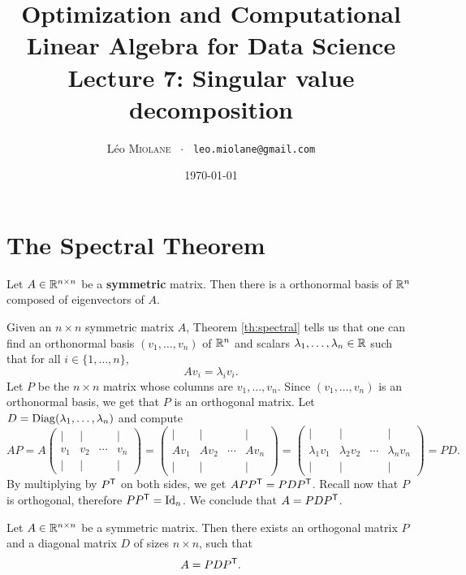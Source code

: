 \documentclass[11pt,nocut]{article}
\title{\vspace{-2.0cm}%
	Optimization and Computational Linear Algebra for Data Science\\
Lecture 7: Singular value decomposition}
\author{Léo \textsc{Miolane} \ $\cdot$ \ \texttt{leo.miolane@gmail.com}}
\date{\today}
\begin{document}
\maketitle


\section{The Spectral Theorem}


\begin{theorem}\label{th:spectral}
	Let $A \in \mathbb{R}^{n \times n}$ be a \textbf{symmetric} matrix. Then there is a orthonormal basis of $\mathbb{R}^n$ composed of eigenvectors of $A$.
\end{theorem}

Given an $n \times n$ symmetric matrix $A$, Theorem \ref{th:spectral} tells us that one can find an orthonormal basis $(v_1, \dots, v_n)$ of $\mathbb{R}^n$ and scalars $\lambda_1, \dots, \lambda_n \in \mathbb{R}$ such that for all $i \in \{1, \dots, n\}$,
$$
A v_i = \lambda_i v_i.
$$
Let $P$ be the $n \times n$ matrix whose columns are $v_1, \dots, v_n$. Since $(v_1, \dots, v_n)$ is an orthonormal basis, we get that $P$ is an orthogonal matrix. Let $D = {\rm Diag}(\lambda_1, \dots, \lambda_n)$ and compute
$$
A P
= 
A 
\begin{pmatrix}
	| & | & & | \\
	v_1 & v_2 & \cdots& v_n \\
	| & | & & |
\end{pmatrix}
= 
\begin{pmatrix}
	| & | & & | \\
	Av_1 & Av_2 & \cdots& Av_n \\
	| & | & & |
\end{pmatrix}
= 
\begin{pmatrix}
	| & | & & | \\
	\lambda_1 v_1 & \lambda_2 v_2 & \cdots& \lambda_n v_n \\
	| & | & & |
\end{pmatrix}
= P D.
$$
By multiplying by $P^{{\sf T}}$ on both sides, we get $A P P^{{\sf T}} = P D P^{{\sf T}}$. Recall now that $P$ is orthogonal, therefore $P P^{{\sf T}} = {{\rm Id}}_n$. We conclude that $A = P D P^{{\sf T}}$.

\begin{theorem}\label{th:spectral2}
	Let $A \in \mathbb{R}^{n \times n}$ be a symmetric matrix. Then there exists an orthogonal matrix $P$ and a diagonal matrix $D$ of sizes $n \times n$, such that
	$$
	A = P D P^{{\sf T}}.
	$$
\end{theorem}
\end{document}
